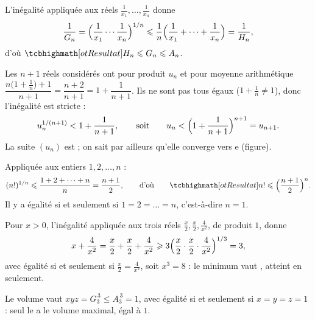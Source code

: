 \begin{corrigeEval}[Applications]{}{}
\begin{questions}[start=7]
  \item L'inégalité appliquée aux réels $\frac1{x_1},\dots,\frac1{x_n}$
    donne
    \[\frac{1}{G_n}=\Bigl(\frac{1}{x_1}\cdots\frac{1}{x_n}\Bigr)^{1/n}
      \leqslant\frac1n\Bigl(\frac{1}{x_1}+\dots+\frac{1}{x_n}\Bigr)=\frac{1}{H_n},\]
    d'où $\res{H_n\leqslant G_n\leqslant A_n}$.
  \item Les $n+1$ réels considérés ont pour produit $u_n$ et pour moyenne
    arithmétique $\dfrac{n\bigl(1+\frac1n\bigr)+1}{n+1}=\dfrac{n+2}{n+1}=1+\dfrac{1}{n+1}$.
    Ils ne sont pas tous égaux ($1+\frac1n\neq1$), donc l'inégalité est
    stricte :
    \[u_n^{1/(n+1)}<1+\frac{1}{n+1},\qquad\text{soit}\qquad
      u_n<\Bigl(1+\frac{1}{n+1}\Bigr)^{n+1}=u_{n+1}.\]
    La suite $(u_n)$ est  ; on sait par
    ailleurs qu'elle converge vers $\mathrm{e}$ (figure).
  \item Appliquée aux entiers $1,2,\dots,n$ :
    \[(n!)^{1/n}\leqslant\frac{1+2+\dots+n}{n}=\frac{n+1}{2},\qquad\text{d'où}\qquad
      \res{n!\leqslant\Bigl(\frac{n+1}{2}\Bigr)^{n}}.\]
    Il y a égalité si et seulement si $1=2=\dots=n$, c'est-à-dire $n=1$.
  \item Pour $x>0$, l'inégalité appliquée aux trois réels
    $\frac x2,\frac x2,\frac{4}{x^{2}}$, de produit $1$, donne
    \[x+\frac{4}{x^{2}}=\frac x2+\frac x2+\frac{4}{x^{2}}\geqslant3\Bigl(\frac x2\cdot\frac x2\cdot\frac{4}{x^{2}}\Bigr)^{1/3}=3,\]
    avec égalité si et seulement si $\frac x2=\frac{4}{x^{2}}$, soit
    $x^{3}=8$ : le minimum vaut , atteint en  seulement.
  \item Le volume vaut $xyz=G_3^{\,3}\leqslant A_3^{\,3}=1$, avec égalité si
    et seulement si $x=y=z=1$ : seul le  a le
    volume maximal, égal à $1$.
\end{questions}
\begin{center}\begin{minipage}{\linewidth}\centering
{}
\end{minipage}
\end{center}
\end{corrigeEval}
